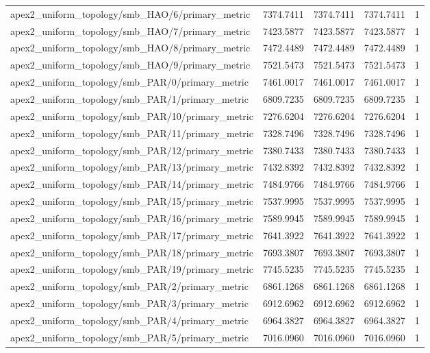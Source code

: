 \begin{table}[h]
\begin{tabular}{lrrrr}
apex2_uniform_topology/smb_HAO/6/primary_metric & 7374.7411 & 7374.7411 & 7374.7411 & 1 \\
apex2_uniform_topology/smb_HAO/7/primary_metric & 7423.5877 & 7423.5877 & 7423.5877 & 1 \\
apex2_uniform_topology/smb_HAO/8/primary_metric & 7472.4489 & 7472.4489 & 7472.4489 & 1 \\
apex2_uniform_topology/smb_HAO/9/primary_metric & 7521.5473 & 7521.5473 & 7521.5473 & 1 \\
apex2_uniform_topology/smb_PAR/0/primary_metric & 7461.0017 & 7461.0017 & 7461.0017 & 1 \\
apex2_uniform_topology/smb_PAR/1/primary_metric & 6809.7235 & 6809.7235 & 6809.7235 & 1 \\
apex2_uniform_topology/smb_PAR/10/primary_metric & 7276.6204 & 7276.6204 & 7276.6204 & 1 \\
apex2_uniform_topology/smb_PAR/11/primary_metric & 7328.7496 & 7328.7496 & 7328.7496 & 1 \\
apex2_uniform_topology/smb_PAR/12/primary_metric & 7380.7433 & 7380.7433 & 7380.7433 & 1 \\
apex2_uniform_topology/smb_PAR/13/primary_metric & 7432.8392 & 7432.8392 & 7432.8392 & 1 \\
apex2_uniform_topology/smb_PAR/14/primary_metric & 7484.9766 & 7484.9766 & 7484.9766 & 1 \\
apex2_uniform_topology/smb_PAR/15/primary_metric & 7537.9995 & 7537.9995 & 7537.9995 & 1 \\
apex2_uniform_topology/smb_PAR/16/primary_metric & 7589.9945 & 7589.9945 & 7589.9945 & 1 \\
apex2_uniform_topology/smb_PAR/17/primary_metric & 7641.3922 & 7641.3922 & 7641.3922 & 1 \\
apex2_uniform_topology/smb_PAR/18/primary_metric & 7693.3807 & 7693.3807 & 7693.3807 & 1 \\
apex2_uniform_topology/smb_PAR/19/primary_metric & 7745.5235 & 7745.5235 & 7745.5235 & 1 \\
apex2_uniform_topology/smb_PAR/2/primary_metric & 6861.1268 & 6861.1268 & 6861.1268 & 1 \\
apex2_uniform_topology/smb_PAR/3/primary_metric & 6912.6962 & 6912.6962 & 6912.6962 & 1 \\
apex2_uniform_topology/smb_PAR/4/primary_metric & 6964.3827 & 6964.3827 & 6964.3827 & 1 \\
apex2_uniform_topology/smb_PAR/5/primary_metric & 7016.0960 & 7016.0960 & 7016.0960 & 1 \\

\end{tabular}
\end{table}
